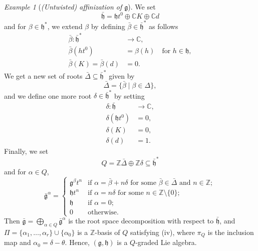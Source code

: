 \documentclass[a4paper, 12pt, reqno]{amsart}
\theoremstyle{remark}
\newtheorem{example}[theorem]{Example}
\begin{document}
\begin{example}[\emph{(Untwisted) affinization of $\mathfrak{g}$}]
  We set
  \begin{equation*}
    \bar{\mathfrak{h}} = \mathfrak{h}t^0 \oplus \mathbb{C}K \oplus \mathbb{C}d
  \end{equation*}
  and for $\beta \in \mathfrak{h}^*$, we extend $\beta$ by defining $\bar{\beta} \in \bar{\mathfrak{h}}^*$ as follows
  \begin{align*}
    \bar{\beta}: \bar{\mathfrak{h}}^* &\to \mathbb{C}, \\
    \bar{\beta}(ht^0) &= \beta(h) \quad \text{for $h \in \mathfrak{h}$}, \\
    \bar{\beta}(K) = \bar{\beta}(d) &= 0.
  \end{align*}
  We get a new set of roots $\bar{\Delta} \subseteq \bar{\mathfrak{h}}^*$ given by
  \begin{equation*}
    \bar{\Delta} = \{\bar{\beta} \mid \beta \in \Delta\},
  \end{equation*}
  and we define one more root $\delta \in \bar{\mathfrak{h}}^*$ by setting
  \begin{align*}
    \delta: \bar{\mathfrak{h}} &\to \mathbb{C}, \\
    \delta(\mathfrak{h}t^0) &= 0, \\
    \delta(K) &= 0, \\
    \delta(d) &= 1.
  \end{align*}
  Finally, we set
  \begin{equation*}
    Q = \mathbb{Z}\bar{\Delta} \oplus \mathbb{Z}\delta \subseteq \bar{\mathfrak{h}}^*
  \end{equation*}
  and for $\alpha \in Q$,
  \begin{equation*}
    \bar{\mathfrak{g}}^{\alpha} =
    \begin{cases}
      \mathfrak{g}^{\beta}t^n &\text{if $\alpha = \bar{\beta} + n\delta$ for some $\bar{\beta} \in \bar{\Delta}$ and $n \in \mathbb{Z}$}; \\
      \mathfrak{h}t^n &\text{if $\alpha = n\delta$ for some $n \in \mathbb{Z} \setminus \{0\}$}; \\
      \mathfrak{h} &\text{if $\alpha = 0$}; \\
      0 &\text{otherwise}.
    \end{cases}
  \end{equation*}
  Then $\bar{\mathfrak{g}} = \bigoplus_{\alpha \in Q}\bar{\mathfrak{g}}^{\alpha}$ is the root space decomposition with respect to $\bar{\mathfrak{h}}$, and $\Pi = \{\alpha_1, \dots, \alpha_r\} \cup \{\alpha_0\}$ is a $\mathbb{Z}$-basis of $Q$ satisfying (iv), where $\pi_Q$ is the inclusion map and $\alpha_0 = \delta - \theta$.
  Hence, $(\mathfrak{g}, \mathfrak{h})$ is a $Q$-graded Lie algebra.
\end{example}
\end{document}
